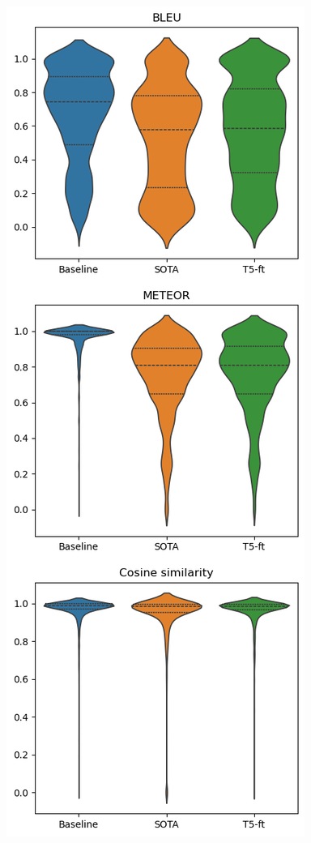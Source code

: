 \begin{multicols*}{2}
\begin{minipage}{\linewidth}
    \includegraphics[scale=0.4]{figures/final/semantic.png}%
    \label{fig:eval:toxdistrlim}%
\end{minipage}


\end{multicols*}
